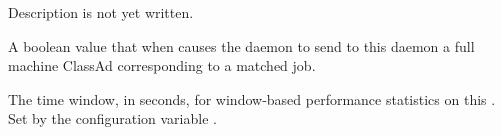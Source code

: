 \begin{description}
\item[\AdAttr{VirtualMemory}:] Description is not yet written.

\item[\AdAttr{WantResAd}:] A boolean value that when 
  causes the  daemon to send to this 
  daemon a full machine ClassAd corresponding to a matched job.

\item[\AdAttr{WindowedStatWidth}:] The time window, in seconds,
  for window-based performance statistics on this .
  Set by the configuration variable .

\end{description}

